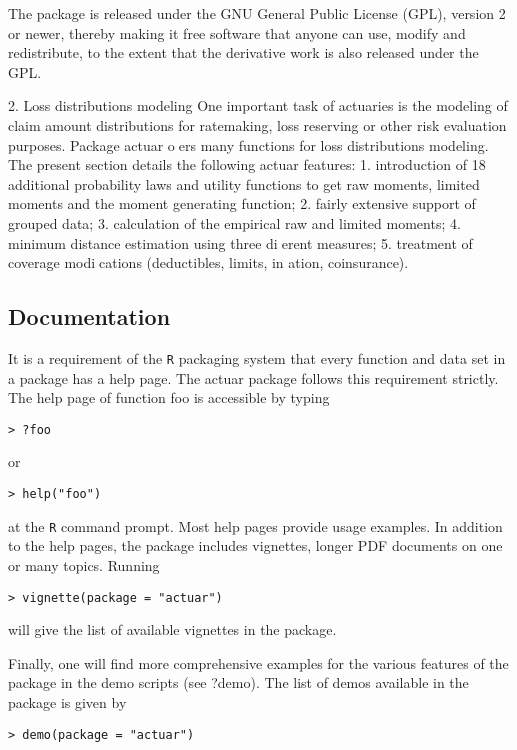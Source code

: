 \documentclass[12pt]{article}
\begin{document}
The package is released under the GNU General Public License (GPL), version 2 or newer, thereby making it free software that anyone can use, modify and redistribute, to the extent that the derivative work is also released under the GPL.

2. Loss distributions modeling
One important task of actuaries is the modeling of claim amount distributions for ratemaking,
loss reserving or other risk evaluation purposes. Package actuar oers many functions for loss
distributions modeling. The present section details the following actuar features:
1. introduction of 18 additional probability laws and utility functions to get raw moments,
limited moments and the moment generating function;
2. fairly extensive support of grouped data;
3. calculation of the empirical raw and limited moments;
4. minimum distance estimation using three dierent measures;
5. treatment of coverage modications (deductibles, limits, in
ation, coinsurance).


\subsection{Documentation}

It is a requirement of the \texttt{R} packaging system that every function and data set in a package has a help page. The actuar package follows this requirement strictly. The help page of function foo is accessible by typing


\begin{verbatim}
> ?foo
\end{verbatim}
or
\begin{verbatim}
> help("foo")
\end{verbatim}


at the \texttt{R} command prompt. Most help pages provide usage examples. In addition to the help pages, the package includes vignettes, longer PDF documents on one or many topics. Running 
\begin{verbatim}
> vignette(package = "actuar")
\end{verbatim}
will give the list of available vignettes in the package.

Finally, one will find more comprehensive examples for the various features of the package in the demo scripts (see ?demo). The list of demos available in the package is given by

\begin{verbatim}
> demo(package = "actuar")
\end{verbatim}
\end{document}
